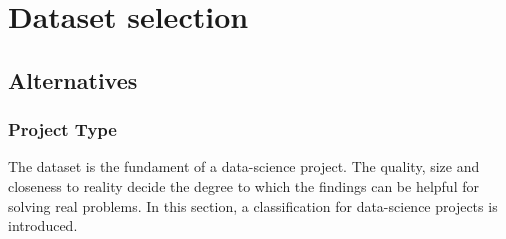 \chapter{Dataset selection}

\section{Alternatives}

	\subsection{Project Type}
	The dataset is the fundament of a data-science project. The quality, size and closeness to reality decide the degree to which the findings can be helpful for solving real problems. 
	In this section, a classification for data-science projects is introduced.
	
